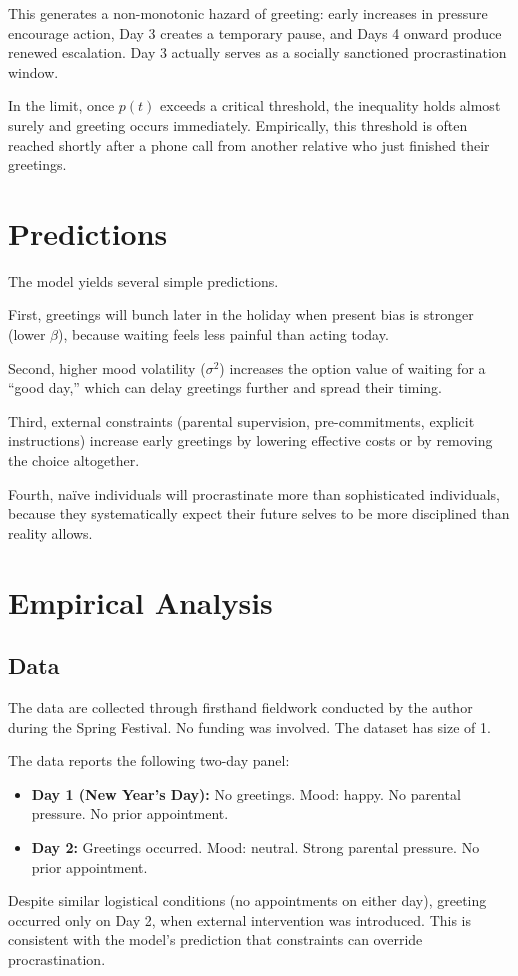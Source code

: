 \documentclass[AER]{AEA}
\begin{document}
This generates a non-monotonic hazard of greeting: early increases in pressure encourage action, Day 3 creates a temporary pause, and Days 4 onward produce renewed escalation. Day 3 actually serves as a socially sanctioned procrastination window.

In the limit, once $p(t)$ exceeds a critical threshold, the inequality holds almost surely and greeting occurs immediately. Empirically, this threshold is often reached shortly after a phone call from another relative who just finished their greetings.

\section{Predictions}
The model yields several simple predictions.

First, greetings will bunch later in the holiday when present bias is stronger (lower $\beta$), because waiting feels less painful than acting today.

Second, higher mood volatility ($\sigma^2$) increases the option value of waiting for a ``good day,'' which can delay greetings further and spread their timing.

Third, external constraints (parental supervision, pre-commitments, explicit instructions) increase early greetings by lowering effective costs or by removing the choice altogether.

Fourth, na\"ive individuals will procrastinate more than sophisticated individuals, because they systematically expect their future selves to be more disciplined than reality allows.

\section{Empirical Analysis}

\subsection{Data}
The data are collected through firsthand fieldwork conducted by the author during the Spring Festival. No funding was involved. The dataset has size of 1.

The data reports the following two-day panel:
\begin{itemize}
\item \textbf{Day 1 (New Year's Day):} No greetings. Mood: happy. No parental pressure. No prior appointment.
\item \textbf{Day 2:} Greetings occurred. Mood: neutral. Strong parental pressure. No prior appointment.
\end{itemize}
Despite similar logistical conditions (no appointments on either day), greeting occurred only on Day 2, when external intervention was introduced. This is consistent with the model's prediction that constraints can override procrastination.
\end{document}
